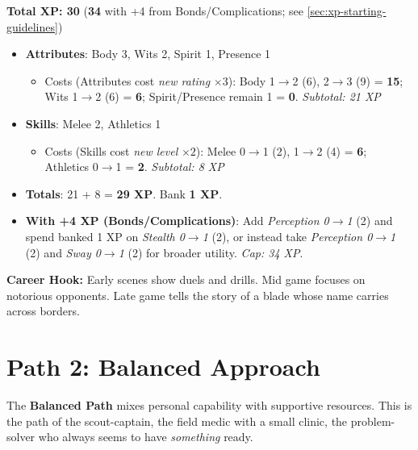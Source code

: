 \noindent\textbf{Total XP: 30} \quad (\textbf{34} with +4 from Bonds/Complications; see \ref{sec:xp-starting-guidelines})

\begin{itemize}
\item \textbf{Attributes}: Body 3, Wits 2, Spirit 1, Presence 1
  \begin{itemize}
  \item Costs (Attributes cost \emph{new rating} $\times 3$):  
        Body 1$\to$2 (6), 2$\to$3 (9) = \textbf{15};  
        Wits 1$\to$2 (6) = \textbf{6};  
        Spirit/Presence remain 1 = \textbf{0}.  
        \emph{Subtotal: 21 XP}
  \end{itemize}
\item \textbf{Skills}: Melee 2, Athletics 1
  \begin{itemize}
  \item Costs (Skills cost \emph{new level} $\times 2$):  
        Melee 0$\to$1 (2), 1$\to$2 (4) = \textbf{6};  
        Athletics 0$\to$1 = \textbf{2}.  
        \emph{Subtotal: 8 XP}
  \end{itemize}
\item \textbf{Totals}: 21 + 8 = \textbf{29 XP}. Bank \textbf{1 XP}.
\item \textbf{With +4 XP (Bonds/Complications)}:  
  Add \emph{Perception 0$\to$1} (2) and spend banked 1 XP on \emph{Stealth 0$\to$1} (2),  
  or instead take \emph{Perception 0$\to$1} (2) and \emph{Sway 0$\to$1} (2) for broader utility.  
  \emph{Cap: 34 XP}.
\end{itemize}

\noindent\textbf{Career Hook:} Early scenes show duels and drills. Mid game focuses on
notorious opponents. Late game tells the story of a blade whose name carries
across borders.


\section{Path 2: Balanced Approach}
\label{sec:xp-balanced-path}

The \textbf{Balanced Path} mixes personal capability with supportive resources.
This is the path of the scout-captain, the field medic with a small clinic, the
problem-solver who always seems to have \emph{something} ready.

